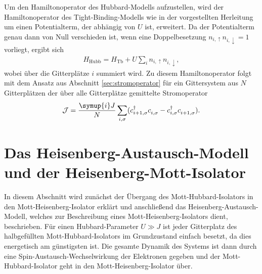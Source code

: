 Um den Hamiltonoperator des Hubbard-Modells aufzustellen, wird der Hamiltonoperator des Tight-Binding-Modells wie in der vorgestellten Herleitung um einen
Potentialterm, der abhängig von $U$ ist, erweitert. Da der Potentialterm genau dann von Null verschieden ist, wenn eine Doppelbesetzung $n_{i,\uparrow} n_{i,\downarrow} = 1$ vorliegt,
ergibt sich
\begin{align}
  H_\text{Hubb} = H_\text{Tb} + U \sum_{i} n_{i,\uparrow} n_{i,\downarrow},
  \label{eqn:hamiltonhubb}
\end{align}
wobei über die Gitterplätze $i$ summiert wird.
Zu diesem Hamiltonoperator folgt mit dem Ansatz aus Abschnitt \ref{sec:stromoperator} für ein Gittersystem aus $N$ Gitterplätzen der
über alle Gitterplätze gemittelte Stromoperator
\begin{align}
  \mathcal{J} = \frac{\symup{i}J}{N} \sum_{i,\sigma} (c_{i+1,\sigma}^{\dag}c_{i,\sigma}^{\phantom{\dag}} - c_{i,\sigma}^{\dag}c_{i+1,\sigma}^{\phantom{\dag}}).
  \label{eqn:stromoperator}
\end{align}
\cite{czycholl,gebhard,uhrig}

\section{Das Heisenberg-Austausch-Modell und der Heisenberg-Mott-Isolator}

In diesem Abschnitt wird zunächst der Übergang des Mott-Hubbard-Isolators in den Mott-Heisenberg-Isolator erklärt
und anschließend das Heisenberg-Austausch-Modell, welches zur Beschreibung eines Mott-Heisenberg-Isolators dient, beschrieben.
Für einen Hubbard-Parameter $U \gg J$ ist jeder Gitterplatz des halbgefüllten Mott-Hubbard-Isolators
im Grundzustand einfach besetzt, da dies energetisch am günstigsten ist.
Die gesamte Dynamik des Systems ist dann durch eine Spin-Austausch-Wechselwirkung der Elektronen gegeben und
der Mott-Hubbard-Isolator geht in den Mott-Heisenberg-Isolator über.


